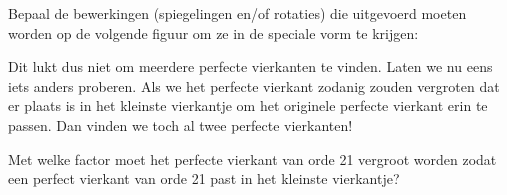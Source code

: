 Bepaal de bewerkingen (spiegelingen en/of rotaties) die uitgevoerd moeten worden op de volgende figuur om ze in de speciale vorm te krijgen:


\begin{center}
  
\end{center}

Dit lukt dus niet om meerdere perfecte vierkanten te vinden. Laten we nu eens iets anders proberen. Als we het perfecte vierkant zodanig zouden vergroten dat er plaats is in het kleinste vierkantje om het originele perfecte vierkant erin te passen. Dan vinden we toch al twee perfecte vierkanten!

Met welke factor moet het perfecte vierkant van orde 21 vergroot worden zodat een perfect vierkant van orde 21 past in het kleinste vierkantje?


























